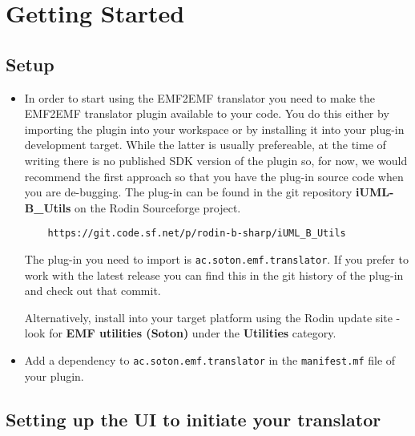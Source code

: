 \section{Getting Started}
\label{sec:getting-started}

\subsection{Setup}
\label{sec:setup}

\begin{itemize}
\item 
In order to start using the EMF2EMF translator you need to make the EMF2EMF translator plugin available to your code. 
You do this either by importing the plugin into your workspace or by installing it into your plug-in development target.
While the latter is usually prefereable, at the time of writing there is no published SDK version of the plugin so, for now, we would recommend the first approach so that you have the plug-in source code when you are de-bugging.
The plug-in can be found in the git repository \textbf{iUML-B\_Utils} on the Rodin Sourceforge project.   
\begin{verbatim}
	https://git.code.sf.net/p/rodin-b-sharp/iUML_B_Utils
\end{verbatim}
The plug-in you need to import is \texttt{ac.soton.emf.translator}.
If you prefer to work with the latest release you can find this in the git history of the plug-in and check out that commit.

Alternatively, install into your target platform using the Rodin update site - look for \textbf{EMF utilities (Soton)} under the \textbf{Utilities} category.
\item 
Add a dependency to \texttt{ac.soton.emf.translator} in the \texttt{manifest.mf} file of your plugin.
\end{itemize}

\subsection{Setting up the UI to initiate your translator}
\label{sec:ui}

